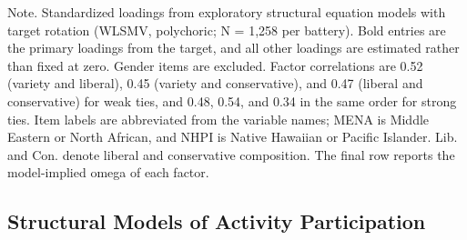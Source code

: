 \documentclass[
  12pt
]{article}
\begin{document}
Note. Standardized loadings from exploratory structural equation models with target rotation (WLSMV, polychoric; N = 1,258 per battery). Bold entries are the primary loadings from the target, and all other loadings are estimated rather than fixed at zero. Gender items are excluded. Factor correlations are 0.52 (variety and liberal), 0.45 (variety and conservative), and 0.47 (liberal and conservative) for weak ties, and 0.48, 0.54, and 0.34 in the same order for strong ties. Item labels are abbreviated from the variable names; MENA is Middle Eastern or North African, and NHPI is Native Hawaiian or Pacific Islander. Lib. and Con. denote liberal and conservative composition. The final row reports the model-implied omega of each factor.


\subsection{Structural Models of Activity Participation}\label{structural-models-of-activity-participation}
\end{document}
